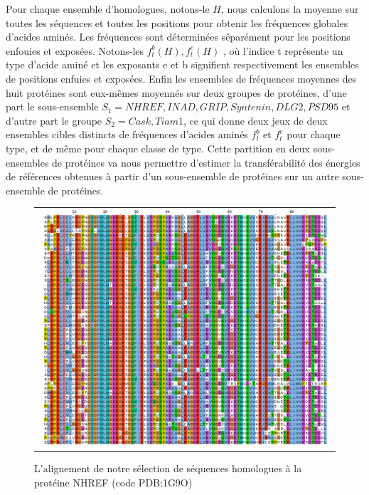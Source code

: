     Pour chaque ensemble d'homologues, notons-le $H$, nous calculons la moyenne sur toutes les séquences et toutes les positions pour obtenir les fréquences globales d'acides aminés. Les fréquences sont déterminées séparément pour les positions enfouies et exposées. Notons-les ${f^b_t(H),f^e_t(H)}$ , où l'indice t représente un type d'acide aminé et les exposants e et b signifient respectivement les ensembles de positions enfuies et exposées. Enfin les ensembles de fréquences moyennes des huit protéines sont eux-mêmes moyennés sur deux groupes de protéines, d'une part le sous-ensemble $S_1 = {NHREF,INAD,GRIP,Syntenin,DLG2,PSD95}$ et d'autre part le groupe $S_2 ={Cask,Tiam1}$, ce qui donne deux jeux de deux  ensembles cibles distincts de fréquences d'acides aminés $f^b_t$ et $f^e_t$ pour chaque type, et de même pour chaque classe de type. Cette partition en deux sous-ensembles de protéines va nous permettre d'estimer la transférabilité des énergies de références obtenues à partir d'un sous-ensemble de protéines sur un autre sous-ensemble de protéines.
\label{subsection:freqaa}
        
\clearpage

   \begin{figure}[t]
     \centering
     \begin{tabular}{c}
       \includegraphics[width=17cm]{homologues/1G9O.png} \\
     \end{tabular}
     \caption{L'alignement de notre sélection de séquences homologues à la protéine NHREF (code PDB:1G9O)}
\label{align_homo:NHREF}
   \end{figure}

